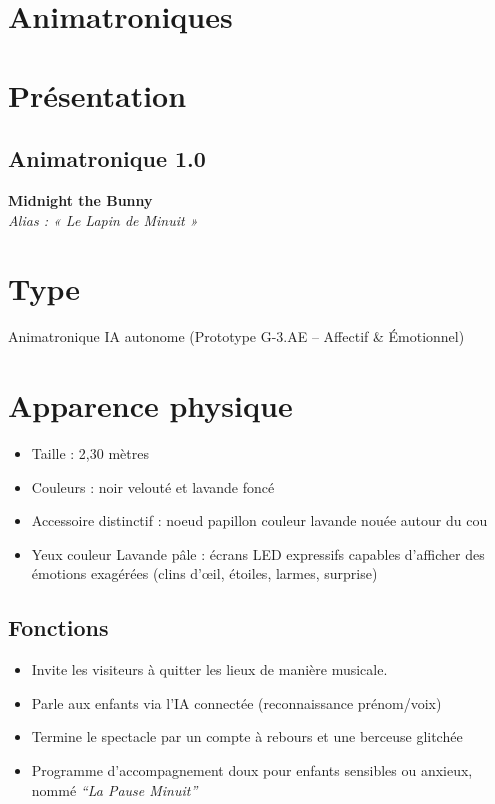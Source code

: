 \section{Animatroniques} %

\section*{Présentation}
\subsection{Animatronique 1.0}

\textbf{Midnight the Bunny}\\
\textit{Alias : « Le Lapin de Minuit »}

\section*{Type}
Animatronique IA autonome (Prototype G-3.AE – Affectif \& Émotionnel)

\section*{Apparence physique}
\begin{itemize}[noitemsep]
  \item Taille : 2,30 mètres
  \item Couleurs : noir velouté et lavande foncé
  \item Accessoire distinctif : noeud papillon couleur lavande nouée autour du cou
  \item Yeux couleur Lavande pâle : écrans LED expressifs capables d’afficher des émotions exagérées (clins d’œil, étoiles, larmes, surprise)
\end{itemize}

\subsection*{Fonctions}
\begin{itemize}[noitemsep]
  \item Invite les visiteurs à quitter les lieux de manière musicale.
  \item Parle aux enfants via l’IA connectée (reconnaissance prénom/voix)
  \item Termine le spectacle par un compte à rebours et une berceuse glitchée
  \item Programme d’accompagnement doux pour enfants sensibles ou anxieux, nommé \textit{“La Pause Minuit”}
\end{itemize}


